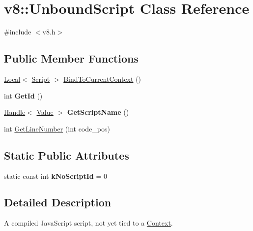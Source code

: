 \hypertarget{classv8_1_1UnboundScript}{\section{v8\-:\-:Unbound\-Script Class Reference}
\label{classv8_1_1UnboundScript}
}


{\ttfamily \#include $<$v8.\-h$>$}

\subsection*{Public Member Functions}
\begin{DoxyCompactItemize}
\item 
\hyperlink{classv8_1_1Local}{Local}$<$ \hyperlink{classv8_1_1Script}{Script} $>$ \hyperlink{classv8_1_1UnboundScript_a0f3354dc71e3f831d10f6e82704a4c2b}{Bind\-To\-Current\-Context} ()
\item 
\hypertarget{classv8_1_1UnboundScript_a7ea1ef6cdb32a845b77a01c6113e7262}{int {\bfseries Get\-Id} ()}\label{classv8_1_1UnboundScript_a7ea1ef6cdb32a845b77a01c6113e7262}

\item 
\hypertarget{classv8_1_1UnboundScript_a1596ab75c9a2a105657531cd0062fbb4}{\hyperlink{classv8_1_1Handle}{Handle}$<$ \hyperlink{classv8_1_1Value}{Value} $>$ {\bfseries Get\-Script\-Name} ()}\label{classv8_1_1UnboundScript_a1596ab75c9a2a105657531cd0062fbb4}

\item 
int \hyperlink{classv8_1_1UnboundScript_a020ca8bbe6ea2313aeedc993ccac3741}{Get\-Line\-Number} (int code\-\_\-pos)
\end{DoxyCompactItemize}
\subsection*{Static Public Attributes}
\begin{DoxyCompactItemize}
\item 
\hypertarget{classv8_1_1UnboundScript_a2d36aeb3abd52d41cf05d1d5f036a0bd}{static const int {\bfseries k\-No\-Script\-Id} = 0}\label{classv8_1_1UnboundScript_a2d36aeb3abd52d41cf05d1d5f036a0bd}

\end{DoxyCompactItemize}


\subsection{Detailed Description}
A compiled Java\-Script script, not yet tied to a \hyperlink{classv8_1_1Context}{Context}. 

